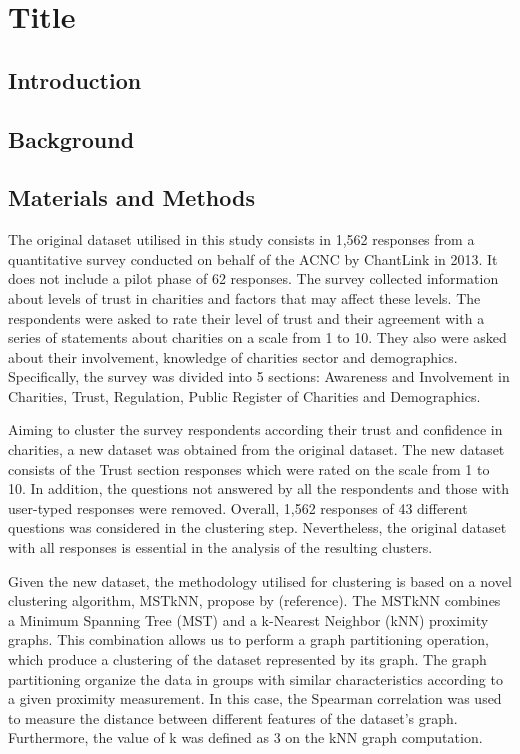 \documentclass{article}
\begin{document}
\section{Title}

\subsection{Introduction}

\subsection{Background}

\subsection{Materials and Methods}

The original dataset utilised in this study consists in 1,562 responses from a
quantitative survey conducted on behalf of the ACNC by ChantLink in 2013. It
does not include a pilot phase of 62 responses. The survey collected information
about levels of trust in charities and factors that may affect these levels. The
respondents were asked to rate their level of trust and their agreement with a
series of statements about charities on a scale from 1 to 10. They also were
asked about their involvement, knowledge of charities sector and demographics.
Specifically, the survey was divided into 5 sections: Awareness and Involvement
in Charities, Trust, Regulation, Public Register of Charities and Demographics.

Aiming to cluster the survey respondents according their trust and confidence in
charities, a new dataset was obtained from the original dataset. The new dataset
consists of the Trust section responses which were rated on the scale from 1 to
10. In addition, the questions not answered by all the respondents and those
with user-typed responses were removed. Overall, 1,562 responses of 43
different questions was considered in the clustering step. Nevertheless, the
original dataset with all responses is essential in the analysis of the
resulting clusters.

Given the new dataset, the methodology utilised for clustering is based on a
novel clustering algorithm, MSTkNN, propose by (reference). The MSTkNN combines
a Minimum Spanning Tree (MST) and a k-Nearest Neighbor (kNN) proximity graphs.
This combination allows us to perform a graph partitioning operation, which
produce a clustering of the dataset represented by its graph. The graph
partitioning organize the data in groups with similar characteristics according
to a given proximity measurement. In this case, the Spearman correlation was
used to measure the distance between different features of the dataset's graph.
Furthermore, the value of k was defined as 3 on the kNN graph computation. 
\end{document}
